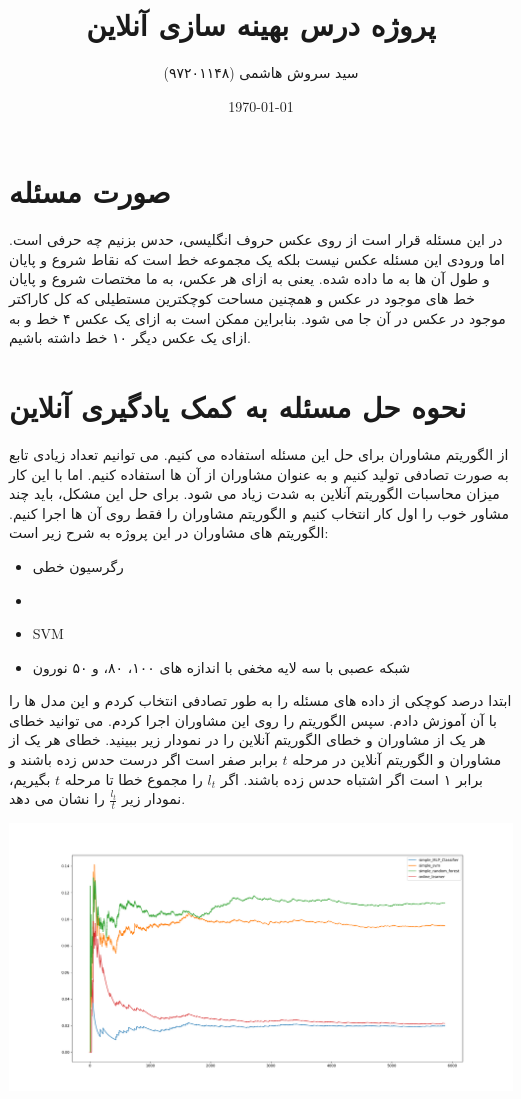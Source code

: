 \documentclass{article}
\title{پروژه درس بهینه سازی آنلاین}
\author{سید سروش هاشمی (۹۷۲۰۱۱۴۸)}
\date{\today}
\begin{document}
\maketitle

\section{صورت مسئله}
در این مسئله قرار است از روی عکس حروف انگلیسی، حدس بزنیم چه حرفی است. اما ورودی این مسئله عکس نیست بلکه یک مجموعه خط است که نقاط شروع و پایان و طول آن ها به ما داده شده. یعنی به ازای هر عکس، به ما مختصات شروع و پایان خط های موجود در عکس و همچنین مساحت کوچکترین مستطیلی که کل کاراکتر موجود در عکس در آن جا می شود. بنابراین ممکن است به ازای یک عکس ۴ خط و به ازای یک عکس دیگر ۱۰ خط داشته باشیم.

\section{نحوه حل مسئله به کمک یادگیری آنلاین}
از الگوریتم مشاوران برای حل این مسئله استفاده می کنیم. می توانیم تعداد زیادی تابع به صورت تصادفی تولید کنیم و به عنوان مشاوران از آن ها استفاده کنیم. اما با این کار میزان محاسبات الگوریتم آنلاین به شدت زیاد می شود. برای حل این مشکل، باید چند مشاور خوب را اول کار انتخاب کنیم و الگوریتم مشاوران را فقط روی آن ها اجرا کنیم. الگوریتم های مشاوران در این پروژه به شرح زیر است:
\begin{itemize}
\item
رگرسیون خطی
\item
{}
\item
SVM
\item
شبکه عصبی 
با سه لایه مخفی با اندازه های ۱۰۰، ۸۰، و ۵۰ نورون
\end{itemize}

ابتدا درصد کوچکی از داده های مسئله را به طور تصادفی انتخاب کردم و این مدل ها را با آن آموزش دادم. سپس الگوریتم 
را روی این مشاوران اجرا کردم. می توانید خطای هر یک از مشاوران و خطای الگوریتم آنلاین را در نمودار زیر ببینید. خطای هر یک از مشاوران و الگوریتم آنلاین در مرحله 
$t$ 
برابر صفر است اگر درست حدس زده باشند و برابر ۱ است اگر اشتباه حدس زده باشند. اگر 
$l_t$ 
را مجموع خطا تا مرحله 
$t$ 
بگیریم، نمودار زیر 
$\frac{l_t}{t}$ 
را نشان می دهد. 

\begin{center}
	\includegraphics[width=\columnwidth]{loss_t.png}
\end{center}
\end{document}
